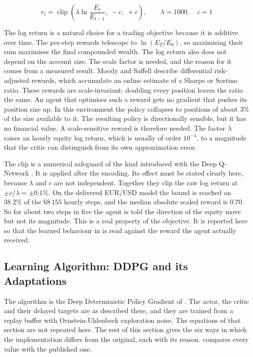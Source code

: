 \begin{equation}
r_t = \operatorname{clip}\!\left(\lambda \ln\!\frac{E_t}{E_{t-1}},\; -c,\; +c\right), \qquad \lambda = 1000, \quad c = 1
\label{Equation:Reward}
\end{equation}

The log return is a natural choice for a trading objective because it is additive over time. The per-step rewards telescope to $\ln(E_T / E_0)$, so maximising their sum maximises the final compounded wealth. The log return also does not depend on the account size. The scale factor is needed, and the reason for it comes from a measured result. Moody and Saffell describe differential risk-adjusted rewards, which accumulate an online estimate of a Sharpe or Sortino ratio. These rewards are scale-invariant: doubling every position leaves the ratio the same. An agent that optimises such a reward gets no gradient that pushes its position size up. In this environment the policy collapses to positions of about $3\%$ of the size available to it. The resulting policy is directionally sensible, but it has no financial value. A scale-sensitive reward is therefore needed. The factor $\lambda$ raises an hourly equity log return, which is usually of order $10^{-4}$, to a magnitude that the critic can distinguish from its own approximation error.

The clip is a numerical safeguard of the kind introduced with the Deep Q-Network \cite{mnih_human-level_2015}. It is applied after the encoding. Its effect must be stated clearly here, because $\lambda$ and $c$ are not independent. Together they clip the raw log return at $\pm c / \lambda = \pm 0.1\%$. On the delivered EUR/USD model the bound is reached on $38.2\%$ of the $68\,155$ hourly steps, and the median absolute scaled reward is $0.70$. So for about two steps in five the agent is told the direction of the equity move but not its magnitude. This is a real property of the objective. It is reported here so that the learned behaviour in  is read against the reward the agent actually received.

\subsection{Learning Algorithm: DDPG and its Adaptations}

The algorithm is the Deep Deterministic Policy Gradient of . The actor, the critic and their delayed targets are as described there, and they are trained from a replay buffer with Ornstein-Uhlenbeck exploration noise. The equations of that section are not repeated here. The rest of this section gives the six ways in which the implementation differs from the original, each with its reason.  compares every value with the published one.

